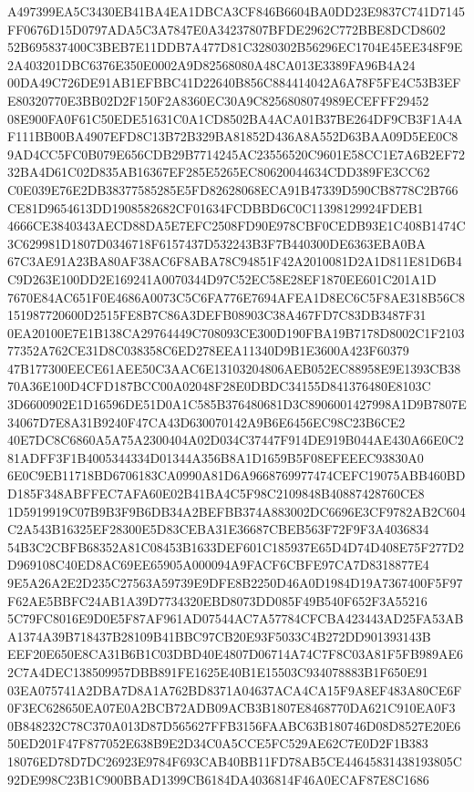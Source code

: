 \documentclass[UTF8,fontset=fandol,zihao=-4,a4paper]{ctexart}
\begin{document}
{{A497399EA5C3430EB41BA4EA1DBCA3CF846B6604BA0DD23E9837C741D7145FF0676D15D0797ADA5C3A7847E0A34237807BFDE2962C772BBE8DCD8602
52B695837400C3BEB7E11DDB7A477D81C3280302B56296EC1704E45EE348F9E2A403201DBC6376E350E0002A9D82568080A48CA013E3389FA96B4A24
00DA49C726DE91AB1EFBBC41D22640B856C884414042A6A78F5FE4C53B3EFE80320770E3BB02D2F150F2A8360EC30A9C8256808074989ECEFFF29452
08E900FA0F61C50EDE51631C0A1CD8502BA4ACA01B37BE264DF9CB3F1A4AF111BB00BA4907EFD8C13B72B329BA81852D436A8A552D63BAA09D5EE0C8
9AD4CC5FC0B079E656CDB29B7714245AC23556520C9601E58CC1E7A6B2EF7232BA4D61C02D835AB16367EF285E5265EC80620044634CDD389FE3CC62
C0E039E76E2DB38377585285E5FD82628068ECA91B47339D590CB8778C2B766CE81D9654613DD1908582682CF01634FCDBBD6C0C11398129924FDEB1
4666CE3840343AECD88DA5E7EFC2508FD90E978CBF0CEDB93E1C408B1474C3C629981D1807D0346718F6157437D532243B3F7B440300DE6363EBA0BA
67C3AE91A23BA80AF38AC6F8ABA78C94851F42A2010081D2A1D811E81D6B4C9D263E100DD2E169241A0070344D97C52EC58E28EF1870EE601C201A1D
7670E84AC651F0E4686A0073C5C6FA776E7694AFEA1D8EC6C5F8AE318B56C8151987720600D2515FE8B7C86A3DEFB08903C38A467FD7C83DB3487F31
0EA20100E7E1B138CA29764449C708093CE300D190FBA19B7178D8002C1F210377352A762CE31D8C038358C6ED278EEA11340D9B1E3600A423F60379
47B177300EECE61AEE50C3AAC6E13103204806AEB052EC88958E9E1393CB3870A36E100D4CFD187BCC00A02048F28E0DBDC34155D841376480E8103C
3D6600902E1D16596DE51D0A1C585B376480681D3C8906001427998A1D9B7807E34067D7E8A31B9240F47CA43D630070142A9B6E6456EC98C23B6CE2
40E7DC8C6860A5A75A2300404A02D034C37447F914DE919B044AE430A66E0C281ADFF3F1B4005344334D01344A356B8A1D1659B5F08EFEEEC93830A0
6E0C9EB11718BD6706183CA0990A81D6A9668769977474CEFC19075ABB460BDD185F348ABFFEC7AFA60E02B41BA4C5F98C2109848B40887428760CE8
1D5919919C07B9B3F9B6DB34A2BEFBB374A883002DC6696E3CF9782AB2C604C2A543B16325EF28300E5D83CEBA31E36687CBEB563F72F9F3A4036834
54B3C2CBFB68352A81C08453B1633DEF601C185937E65D4D74D408E75F277D2D969108C40ED8AC69EE65905A000094A9FACF6CBFE97CA7D8318877E4
9E5A26A2E2D235C27563A59739E9DFE8B2250D46A0D1984D19A7367400F5F97F62AE5BBFC24AB1A39D7734320EBD8073DD085F49B540F652F3A55216
5C79FC8016E9D0E5F87AF961AD07544AC7A57784CFCBA423443AD25FA53ABA1374A39B718437B28109B41BBC97CB20E93F5033C4B272DD901393143B
EEF20E650E8CA31B6B1C03DBD40E4807D06714A74C7F8C03A81F5FB989AE62C7A4DEC138509957DBB891FE1625E40B1E15503C934078883B1F650E91
03EA075741A2DBA7D8A1A762BD8371A04637ACA4CA15F9A8EF483A80CE6F0F3EC628650EA07E0A2BCB72ADB09ACB3B1807E8468770DA621C910EA0F3
0B848232C78C370A013D87D565627FFB3156FAABC63B180746D08D8527E20E650ED201F47F877052E638B9E2D34C0A5CCE5FC529AE62C7E0D2F1B383
18076ED78D7DC26923E9784F693CAB40BB11FD78AB5CE44645831438193805C92DE998C23B1C900BBAD1399CB6184DA4036814F46A0ECAF87E8C1686
}}
\end{document}

